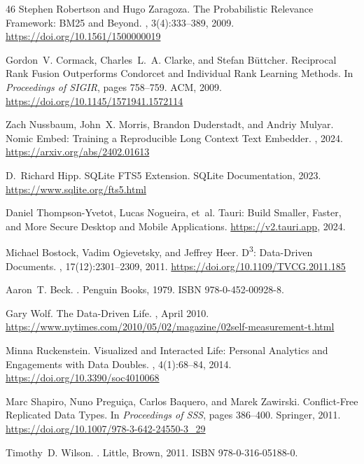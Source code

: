 \documentclass[manuscript,review]{acmart}
\begin{document}
\begin{thebibliography}{46}
Stephen Robertson and Hugo Zaragoza.
\newblock The Probabilistic Relevance Framework: BM25 and Beyond.
, 3(4):333--389, 2009.
\newblock \url{https://doi.org/10.1561/1500000019}

Gordon~V. Cormack, Charles~L.~A. Clarke, and Stefan B{\"u}ttcher.
\newblock Reciprocal Rank Fusion Outperforms Condorcet and Individual Rank Learning Methods.
\newblock In {\em Proceedings of SIGIR}, pages 758--759. ACM, 2009.
\newblock \url{https://doi.org/10.1145/1571941.1572114}

Zach Nussbaum, John~X. Morris, Brandon Duderstadt, and Andriy Mulyar.
\newblock Nomic Embed: Training a Reproducible Long Context Text Embedder.
, 2024.
\newblock \url{https://arxiv.org/abs/2402.01613}

D.~Richard Hipp.
\newblock SQLite FTS5 Extension.
\newblock SQLite Documentation, 2023.
\newblock \url{https://www.sqlite.org/fts5.html}

Daniel Thompson-Yvetot, Lucas Nogueira, et~al.
\newblock Tauri: Build Smaller, Faster, and More Secure Desktop and Mobile Applications.
\newblock \url{https://v2.tauri.app}, 2024.

Michael Bostock, Vadim Ogievetsky, and Jeffrey Heer.
\newblock D\textsuperscript{3}: Data-Driven Documents.
, 17(12):2301--2309, 2011.
\newblock \url{https://doi.org/10.1109/TVCG.2011.185}

Aaron~T. Beck.
.
\newblock Penguin Books, 1979.
\newblock ISBN 978-0-452-00928-8.

Gary Wolf.
\newblock The Data-Driven Life.
, April 2010.
\newblock \url{https://www.nytimes.com/2010/05/02/magazine/02self-measurement-t.html}

Minna Ruckenstein.
\newblock Visualized and Interacted Life: Personal Analytics and Engagements with Data Doubles.
, 4(1):68--84, 2014.
\newblock \url{https://doi.org/10.3390/soc4010068}

Marc Shapiro, Nuno Pregui{\c{c}}a, Carlos Baquero, and Marek Zawirski.
\newblock Conflict-Free Replicated Data Types.
\newblock In {\em Proceedings of SSS}, pages 386--400. Springer, 2011.
\newblock \url{https://doi.org/10.1007/978-3-642-24550-3_29}

Timothy~D. Wilson.
.
\newblock Little, Brown, 2011.
\newblock ISBN 978-0-316-05188-0.

\end{thebibliography}
\end{document}
